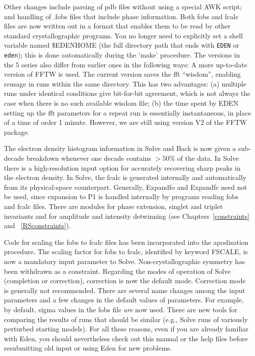 \documentclass{report}
\begin{document}
\vspace {0.1in}

Other changes include parsing of pdb
files without using a special AWK script; and handling of .fobs files that include phase
information.  Both fobs and fcalc files are now written out in a format that enables them 
to be read by other standard crystallographic programs.
You no longer need to explicitly set a shell variable named
\$EDENHOME (the full directory path that ends with {\tt EDEN} or {\tt eden});
this is done
automatically during the 'make' procedure.
The versions in the 5 series also differ from earlier ones in the following
ways:  A more up-to-date version of FFTW is used.  The current version saves 
the fft ``wisdom'', enabling reusage in runs within the same directory.  This has 
two advantages: (a) multiple runs under identical conditions give bit-for-bit
agreement, which is not always the case when there is no such available wisdom
file; (b) the time spent by EDEN setting up the fft parameters for a repeat run
is essentially instantaneous, in place of a time of order 1 minute.  However, we are 
still using version V2 of the FFTW package. 

\vspace {0.1in}

The electron density histogram information in 
Solve and Back is now given a sub-decade breakdown whenever one decade 
contains ${>50\%} $ of the data.  In Solve 
there is a high-resolution input option for accurately recovering
sharp peaks in the electron density.
In Solve,  the fcalc is generated internally and automatically from its
physical-space counterpart.
Generally, Expandfo and Expandfc need not be 
used, since expansion to P1 is handled internally by programs reading fobs and
fcalc files.
There are modules for phase extension, singlet and triplet invariants and 
for amplitude and intensity detwinning (see Chapters~\ref{constraints} 
and ~\ref{RSconstraints}).

\vspace {0.1in}

Code for scaling the fobs to fcalc files has been incorporated 
into the apodization procedure.
The scaling factor for fobs to fcalc, identified by keyword 
FSCALE, is now a mandatory input parameter to 
Solve.
Non-crystallographic symmetry has been withdrawn as a constraint.
Regarding the modes of operation of Solve (completion or correction), correction
is now the default mode.  Correction mode is generally not recommended.
There are several name changes
among the input parameters and a few changes in the default
values of parameters.  For example, by default, sigma values in the fobs file
{\em are} now used.  
There are new tools for comparing the results of runs that should be 
similar (e.g., Solve runs of variously perturbed starting models).
For all these reasons, even if you are already familiar with Eden, 
you should nevertheless check out this manual or the help files before 
resubmitting old input or using Eden for new problems.
\end{document}
